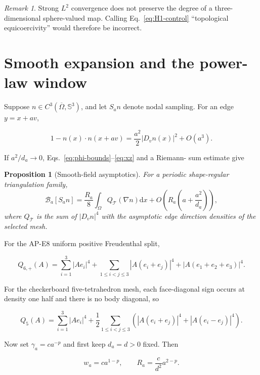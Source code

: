 \documentclass[11pt]{article}
\numberwithin{equation}{section}
\newtheorem{proposition}[theorem]{Proposition}
\theoremstyle{definition}
\theoremstyle{remark}
\newtheorem{remark}[theorem]{Remark}
\newcommand{\SSS}{\mathbb S}
\newcommand{\cB}{\mathcal B}
\newcommand{\cT}{\mathcal T}
\newcommand{\dd}{\mathrm d}
\begin{document}
\begin{remark}
Strong $L^2$ convergence does not preserve the degree of a three-
dimensional sphere-valued map.  Calling Eq.~\eqref{eq:H1-control}
``topological equicoercivity'' would therefore be incorrect.
\end{remark}

\section{Smooth expansion and the power-law window}

Suppose $n\in C^3(\overline\Omega,\SSS^3)$, and let $S_an$ denote nodal
sampling.  For an edge $y=x+av$,

\[
 1-n(x)\cdot n(x+av)
 =\frac{a^2}{2}|D_vn(x)|^2+O(a^3).
\]

If $a^2/d_a\to0$, Eqs.~\eqref{eq:phi-bounds}--\eqref{eq:xz} and a Riemann-
sum estimate give

\begin{proposition}[Smooth-field asymptotics]
For a periodic shape-regular triangulation family,
\begin{equation}
 \cB_a[S_an]
 =\frac{R_a}{8}\int_\Omega Q_{\cT}(\nabla n)\dd x
 +O\!\left(R_a\left(a+\frac{a^2}{d_a}\right)\right),
 \label{eq:smooth-expansion}
\end{equation}
where $Q_{\cT}$ is the sum of $|D_vn|^4$ with the asymptotic edge
direction densities of the selected mesh.
\end{proposition}

For the AP-E8 uniform positive Freudenthal split,

\begin{equation}
 Q_{6,+}(A)=
 \sum_{i=1}^3|Ae_i|^4
 +\sum_{1\le i<j\le3}|A(e_i+e_j)|^4
 +|A(e_1+e_2+e_3)|^4.
 \label{eq:Q6}
\end{equation}

For the checkerboard five-tetrahedron mesh, each face-diagonal sign occurs at
density one half and there is no body diagonal, so

\begin{equation}
 Q_5(A)=\sum_{i=1}^3|Ae_i|^4
 +\frac12\sum_{1\le i<j\le3}
 \left(|A(e_i+e_j)|^4+|A(e_i-e_j)|^4\right).
 \label{eq:Q5}
\end{equation}

Now set $\gamma_a=c a^{-p}$ and first keep $d_a=d>0$ fixed.  Then

\begin{equation}
 w_a=c a^{1-p},\qquad R_a=\frac{c}{d^2}a^{2-p}.
 \label{eq:p-scaling}
\end{equation}
\end{document}
